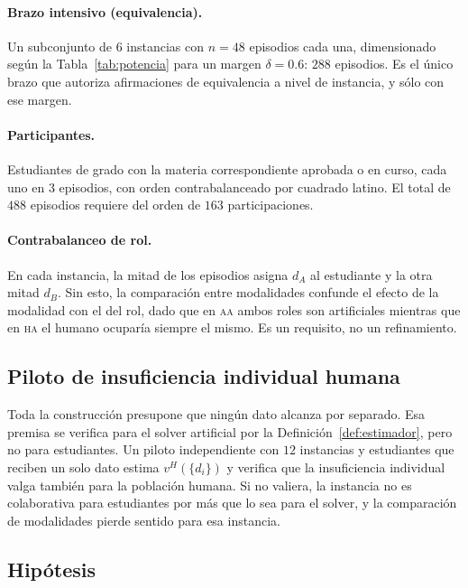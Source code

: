 \documentclass[11pt,a4paper]{article}
\theoremstyle{definition}
\theoremstyle{plain}
\theoremstyle{remark}
\newcommand{\modAA}{\textsc{aa}}
\newcommand{\modHA}{\textsc{ha}}
\begin{document}
\paragraph{Brazo intensivo (equivalencia).} Un subconjunto de $6$ instancias con
$n=48$ episodios cada una, dimensionado según la Tabla~\ref{tab:potencia} para un
margen $\delta=0.6$: $288$ episodios. Es el único brazo que autoriza afirmaciones
de equivalencia a nivel de instancia, y sólo con ese margen.

\paragraph{Participantes.} Estudiantes de grado con la materia correspondiente
aprobada o en curso, cada uno en $3$ episodios, con orden contrabalanceado por
cuadrado latino. El total de $488$ episodios requiere del orden de $163$
participaciones.

\paragraph{Contrabalanceo de rol.} En cada instancia, la mitad de los episodios
asigna $d_A$ al estudiante y la otra mitad $d_B$. Sin esto, la comparación entre
modalidades confunde el efecto de la modalidad con el del rol, dado que en
\modAA{} ambos roles son artificiales mientras que en \modHA{} el humano ocuparía
siempre el mismo. Es un requisito, no un refinamiento.

\subsection{Piloto de insuficiencia individual humana}\label{sec:piloto}

Toda la construcción presupone que ningún dato alcanza por separado. Esa premisa
se verifica para el solver artificial por la Definición~\ref{def:estimador}, pero
no para estudiantes. Un piloto independiente con $12$ instancias y estudiantes que
reciben un solo dato estima $v^{H}(\{d_i\})$ y verifica que la insuficiencia
individual valga también para la población humana. Si no valiera, la instancia no
es colaborativa para estudiantes por más que lo sea para el solver, y la
comparación de modalidades pierde sentido para esa instancia.

\subsection{Hipótesis}
\end{document}
